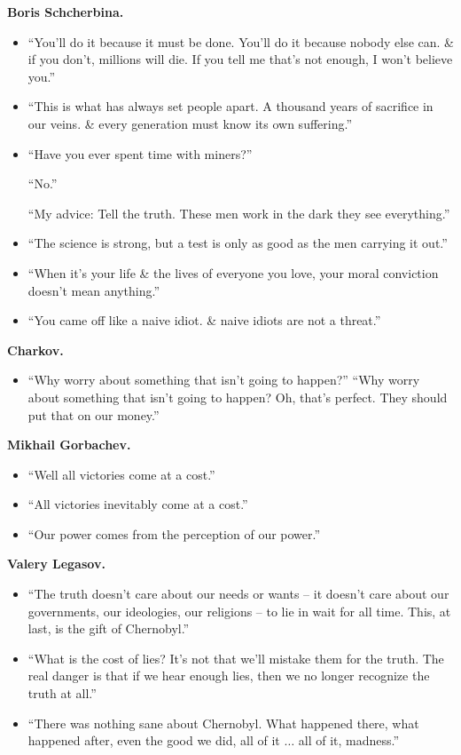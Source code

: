 \documentclass{article}
\begin{document}
\begin{enumerate}
	{\bf Boris Schcherbina.}
	\begin{itemize}
		\item ``You'll do it because it must be done. You'll do it because nobody else can. \& if you don't, millions will die. If you tell me that's not enough, I won't believe you.''
		\item ``This is what has always set people apart. A thousand years of sacrifice in our veins. \& every generation must know its own suffering.''
		\item ``Have you ever spent time with miners?''

		``No.''

		``My advice: Tell the truth. These men work in the dark they see everything.''
		\item ``The science is strong, but a test is only as good as the men carrying it out.''
		\item ``When it's your life \& the lives of everyone you love, your moral conviction doesn't mean anything.''
		\item ``You came off like a naive idiot. \& naive idiots are not a threat.''
	\end{itemize}
	{\bf Charkov.}
	\begin{itemize}
		\item ``Why worry about something that isn't going to happen?'' ``Why worry about something that isn't going to happen? Oh, that's perfect. They should put that on our money.''
	\end{itemize}
	{\bf Mikhail Gorbachev.}
	\begin{itemize}
		\item ``Well all victories come at a cost.''
		\item ``All victories inevitably come at a cost.''
		\item ``Our power comes from the perception of our power.''
	\end{itemize}
	{\bf Valery Legasov.}
	\begin{itemize}
		\item ``The truth doesn't care about our needs or wants -- it doesn't care about our governments, our ideologies, our religions -- to lie in wait for all time. This, at last, is the gift of Chernobyl.''
		\item ``What is the cost of lies? It's not that we'll mistake them for the truth. The real danger is that if we hear enough lies, then we no longer recognize the truth at all.''
		\item ``There was nothing sane about Chernobyl. What happened there, what happened after, even the good we did, all of it $\ldots$ all of it, madness.''

\end{itemize}
\end{enumerate}
\end{document}

